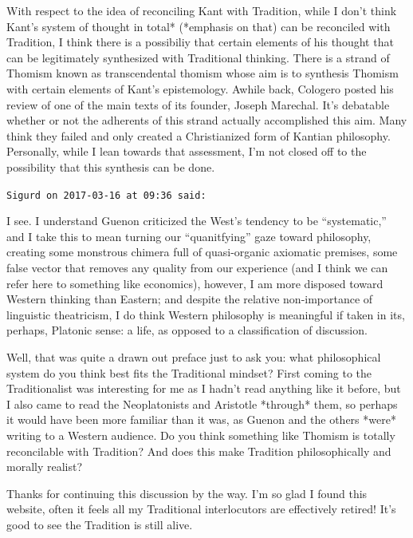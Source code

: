 \begin{footnotesize}
\begin{sffamily}
With respect to the idea of reconciling Kant with Tradition, while I don't think Kant's system of thought in total* (*emphasis on that) can be reconciled with Tradition, I think there is a possibiliy that certain elements of his thought that can be legitimately synthesized with Traditional thinking. There is a strand of Thomism known as transcendental thomism whose aim is to synthesis Thomism with certain elements of Kant's epistemology. Awhile back, Cologero posted his review of one of the main texts of its founder, Joseph Marechal. It's debatable whether or not the adherents of this strand actually accomplished this aim. Many think they failed and only created a Christianized form of Kantian philosophy. Personally, while I lean towards that assessment, I'm not closed off to the possibility that this synthesis can be done.

\hfill

\texttt{Sigurd on 2017-03-16 at 09:36 said:}

I see. I understand Guenon criticized the West's tendency to be ``systematic,'' and I take this to mean turning our ``quanitfying'' gaze toward philosophy, creating some monstrous chimera full of quasi-organic axiomatic premises, some false vector that removes any quality from our experience (and I think we can refer here to something like economics), however, I am more disposed toward Western thinking than Eastern; and despite the relative non-importance of linguistic theatricism, I do think Western philosophy is meaningful if taken in its, perhaps, Platonic sense: a life, as opposed to a classification of discussion.

Well, that was quite a drawn out preface just to ask you: what philosophical system do you think best fits the Traditional mindset? First coming to the Traditionalist was interesting for me as I hadn't read anything like it before, but I also came to read the Neoplatonists and Aristotle *through* them, so perhaps it would have been more familiar than it was, as Guenon and the others *were* writing to a Western audience. Do you think something like Thomism is totally reconcilable with Tradition? And does this make Tradition philosophically and morally realist?

Thanks for continuing this discussion by the way. I'm so glad I found this website, often it feels all my Traditional interlocutors are effectively retired! It's good to see the Tradition is still alive.


\hfill

\end{sffamily}
\end{footnotesize}


